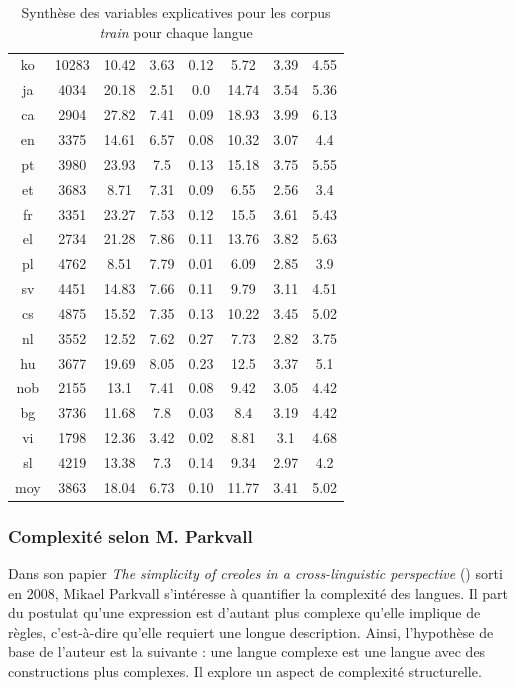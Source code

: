 \documentclass[a4paper, twoside, 12pt]{article}
\begin{document}
\begin{table}[!h]
\begin{tabulary}{\textwidth}{CCCCCCCC}
        ko & 10283 & 10.42 & 3.63 & 0.12 & 5.72 & 3.39 & 4.55 \\
        ja & 4034 & 20.18 & 2.51 & 0.0 & 14.74 & 3.54 & 5.36 \\
        ca & 2904 & 27.82 & 7.41 & 0.09 & 18.93 & 3.99 & 6.13 \\
        en & 3375 & 14.61 & 6.57 & 0.08 & 10.32 & 3.07 & 4.4 \\
        pt & 3980 & 23.93 & 7.5 & 0.13 & 15.18 & 3.75 & 5.55 \\
        et & 3683 & 8.71 & 7.31 & 0.09 & 6.55 & 2.56 & 3.4 \\
        fr & 3351 & 23.27 & 7.53 & 0.12 & 15.5 & 3.61 & 5.43 \\
        el & 2734 & 21.28 & 7.86 & 0.11 & 13.76 & 3.82 & 5.63 \\
        pl & 4762 & 8.51 & 7.79 & 0.01 & 6.09 & 2.85 & 3.9 \\
        sv & 4451 & 14.83 & 7.66 & 0.11 & 9.79 & 3.11 & 4.51 \\
        cs & 4875 & 15.52 & 7.35 & 0.13 & 10.22 & 3.45 & 5.02 \\
        nl & 3552 & 12.52 & 7.62 & 0.27 & 7.73 & 2.82 & 3.75 \\
        hu & 3677 & 19.69 & 8.05 & 0.23 & 12.5 & 3.37 & 5.1 \\
        nob & 2155 & 13.1 & 7.41 & 0.08 & 9.42 & 3.05 & 4.42 \\
        bg & 3736 & 11.68 & 7.8 & 0.03 & 8.4 & 3.19 & 4.42 \\
        vi & 1798 & 12.36 & 3.42 & 0.02 & 8.81 & 3.1 & 4.68 \\
        sl & 4219 & 13.38 & 7.3 & 0.14 & 9.34 & 2.97 & 4.2 \\
        \midrule
        moy & 3863 & 18.04 & 6.73 & 0.10 & 11.77 & 3.41 & 5.02 \\
        \bottomrule
    \end{tabulary}
    \caption{Synthèse des variables explicatives pour les corpus \textit{train} pour chaque langue}
    \label{tab:varexp}
\end{table}

    \FloatBarrier

    \subsubsection{Complexité selon M. Parkvall}

    Dans son papier \textit{The simplicity of creoles in a cross-linguistic perspective} (\cite{parkvall}) sorti en 2008, Mikael Parkvall s’intéresse à quantifier la complexité des langues. Il part du postulat qu’une expression est d’autant plus complexe qu’elle implique de règles, c’est-à-dire qu’elle requiert une longue description. Ainsi, l'hypothèse de base de l’auteur est la suivante : une langue complexe est une langue avec des constructions plus complexes. Il explore un aspect de complexité structurelle.
\end{document}
